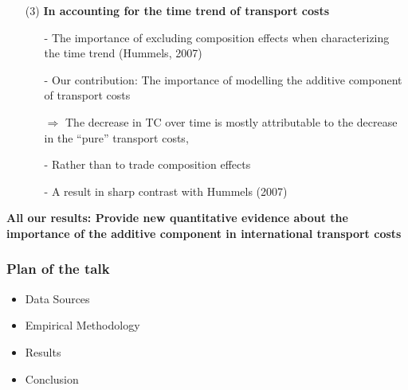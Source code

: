 \documentclass[10 pt,Helvetica, french]{beamer}
\begin{document}
\begin{frame}
\begin{itemize}
\item[(3)] \textbf{In accounting for the time trend of transport costs} \vspace{0.1cm}
\begin{itemize}
\item[-] The importance of excluding composition effects when characterizing the time trend (Hummels, 2007) \vspace{0.1cm}
\item[-] Our contribution: The importance of modelling the additive component of transport costs \vspace{0.1cm}
\item[$\Rightarrow$] The decrease in TC over time is mostly attributable to the decrease in the ``pure'' transport costs,  \vspace{0.1cm}
\item[-] Rather than to trade composition effects  \vspace{0.1cm}
\item[-] A result in sharp contrast with Hummels (2007) \vspace{0.2cm}
\end{itemize}
\end{itemize}
\textbf{All our results: Provide new quantitative evidence about the importance of the additive component in international transport costs}

\end{frame}


\begin{frame}
\frametitle{Plan of the talk}
\begin{itemize}
\item Data Sources  \vspace{0.2cm}
\item Empirical Methodology \vspace{0.2cm}
\item Results \vspace{0.2cm}
\item Conclusion
\end{itemize}
\end{frame}
\end{document}
